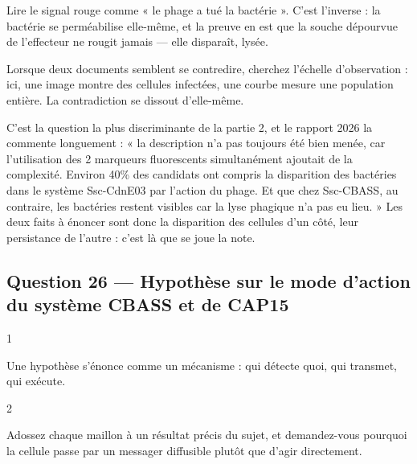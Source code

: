 \documentclass[11pt,a4paper]{article}
\begin{document}
\begin{piege}

Lire le signal rouge comme « le phage a tué la bactérie ». C'est l'inverse : la bactérie se perméabilise elle-même, et la preuve en est que la souche dépourvue de l'effecteur ne rougit jamais --- elle disparaît, lysée.

\end{piege}

\begin{methode}

Lorsque deux documents semblent se contredire, cherchez l'échelle d'observation : ici, une image montre des cellules infectées, une courbe mesure une population entière. La contradiction se dissout d'elle-même.

\end{methode}

\begin{jury}

C'est la question la plus discriminante de la partie 2, et le rapport 2026 la commente longuement : « la description n'a pas toujours été bien menée, car l'utilisation des 2 marqueurs fluorescents simultanément ajoutait de la complexité. Environ 40\% des candidats ont compris la disparition des bactéries dans le système Ssc-CdnE03 par l'action du phage. Et que chez Ssc-CBASS, au contraire, les bactéries restent visibles car la lyse phagique n'a pas eu lieu. » Les deux faits à énoncer sont donc la disparition des cellules d'un côté, leur persistance de l'autre : c'est là que se joue la note.

\end{jury}

\hypertarget{question-26-hypothuxe8se-sur-le-mode-daction-du-systuxe8me-cbass-et-de-cap15}{%
\subsection{Question 26 --- Hypothèse sur le mode d'action du système CBASS et de CAP15}\label{question-26-hypothuxe8se-sur-le-mode-daction-du-systuxe8me-cbass-et-de-cap15}}

\begin{indication}{1}

Une hypothèse s'énonce comme un mécanisme : qui détecte quoi, qui transmet, qui exécute.

\end{indication}

\begin{indication}{2}

Adossez chaque maillon à un résultat précis du sujet, et demandez-vous pourquoi la cellule passe par un messager diffusible plutôt que d'agir directement.

\end{indication}
\end{document}
